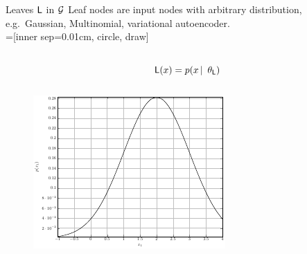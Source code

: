 \begin{frame}{Leaves $\mathsf{L}$ in $\mathcal{G}$}
 Leaf nodes are input nodes with arbitrary distribution, e.g.~Gaussian, Multinomial, variational autoencoder.\\[1em]
 
=[inner sep=0.01cm, circle, draw]
\begin{columns}
\begin{column}{.2\linewidth}
\end{column}
\begin{column}{.2\linewidth}
\end{column}
\begin{column}{.4\linewidth}
$\Leaf(x) = p(x \cbar \tp_\Leaf)$
\end{column}
\begin{column}{.2\linewidth}
\end{column}
\end{columns}

\centering
\begin{figure}
\includegraphics{leaf_distribution}
\end{figure}
\end{frame}

